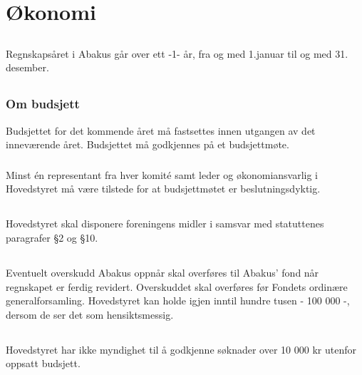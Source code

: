 \section{Økonomi}

\subsection{}
Regnskapsåret i Abakus går over ett -1- år, fra og med 1.januar til og med 31. desember.

\subsection{}
\subsubsection{Om budsjett}
Budsjettet for det kommende året må fastsettes innen utgangen av det inneværende året. Budsjettet må godkjennes på et budsjettmøte.

\subsubsection{}
Minst én representant fra hver komité samt leder og økonomiansvarlig i Hovedstyret må være tilstede for at budsjettmøtet er beslutningsdyktig.

\subsection{}
Hovedstyret skal disponere foreningens midler i samsvar med statuttenes
paragrafer §2 og §10.

\subsection{}
Eventuelt overskudd Abakus oppnår skal overføres til Abakus’ fond når regnskapet er ferdig revidert.
Overskuddet skal overføres før Fondets ordinære generalforsamling.
Hovedstyret kan holde igjen inntil hundre tusen - 100 000 -, dersom de ser det som hensiktsmessig.

\subsection{}
Hovedstyret har ikke myndighet til å godkjenne søknader over 10 000 kr utenfor
oppsatt budsjett.
